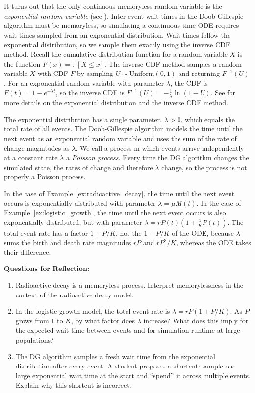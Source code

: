 It turns out that the only continuous memoryless random variable is the \textit{exponential random variable} (see \cite{grimmett2020probability}). Inter-event wait times in the Doob-Gillespie algorithm must be memoryless, so simulating a continuous-time ODE requires wait times sampled from an exponential distribution.
Wait times follow the exponential distribution, so we sample them exactly using the inverse CDF method. Recall the cumulative distribution function for a random variable $X$ is the function $F(x) = \mathbb{P}\left[X \leq x\right]$. The inverse CDF method samples a random variable $X$ with CDF $F$ by sampling $U \sim \text{Uniform}(0, 1)$ and returning $F^{-1}(U)$. For an exponential random variable with parameter $\lambda$, the CDF is $F(t) = 1 - e^{-\lambda t}$, so the inverse CDF is $F^{-1}(U) = -\frac{1}{\lambda}\ln(1-U)$. See \cite{grimmett2020probability} for more details on the exponential distribution and the inverse CDF method.

The exponential distribution has a single parameter, $\lambda > 0$, which equals the total rate of all events. The Doob-Gillespie algorithm models the time until the next event as an exponential random variable and uses the sum of the rate of change magnitudes as $\lambda$. We call a process in which events arrive independently at a constant rate $\lambda$ a \textit{Poisson process}. Every time the DG algorithm changes the simulated state, the rates of change and therefore $\lambda$ change, so the process is not properly a Poisson process.

In the case of Example~\ref{ex:radioactive_decay}, the time until the next event occurs is exponentially distributed with parameter $\lambda = \mu M(t)$. In the case of Example~\ref{ex:logistic_growth}, the time until the next event occurs is also exponentially distributed, but with parameter $\lambda = rP(t)\left(1 + \frac{1}{K}P(t)\right)$. The total event rate has a factor $1 + P/K$, not the $1 - P/K$ of the ODE, because $\lambda$ sums the birth and death rate magnitudes $rP$ and $rP^2/K$, whereas the ODE takes their difference.

\noindent \textup{{\bf Questions for Reflection:}}
\begin{enumerate}
\item Radioactive decay is a memoryless process. Interpret memorylessness in the context of the radioactive decay model.

\item In the logistic growth model, the total event rate is $\lambda = rP(1 + P/K)$. As $P$ grows from $1$ to $K$, by what factor does $\lambda$ increase? What does this imply for the expected wait time between events and for simulation runtime at large populations?

\item The DG algorithm samples a fresh wait time from the exponential distribution after every event. A student proposes a shortcut: sample one large exponential wait time at the start and ``spend'' it across multiple events. Explain why this shortcut is incorrect.

\end{enumerate}


